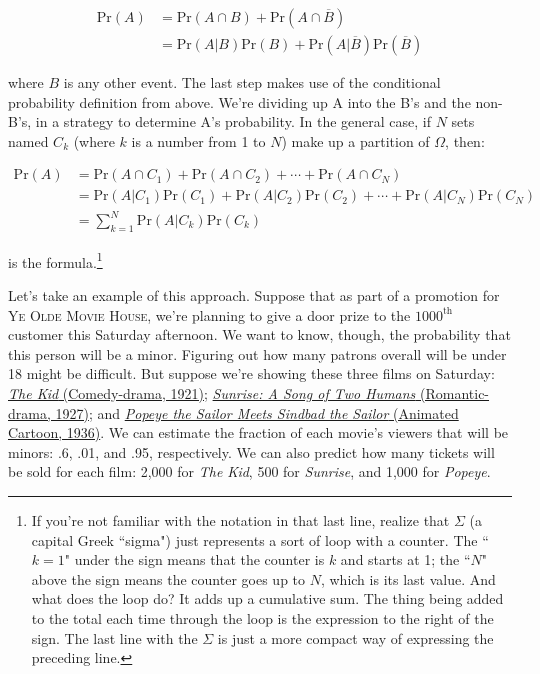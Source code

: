 \begin{align*}
\text{Pr}(A) &= \text{Pr}(A \cap B) + \text{Pr}(A \cap \overline{B}) \\
&= \text{Pr}(A|B) \text{Pr}(B) + \text{Pr}(A|\overline{B}) \text{Pr}(\overline{B})
\end{align*}

where $B$ is any other event. The last step makes use of the conditional
probability definition from above. We're dividing up A into the B's and the
non-B's, in a strategy to determine A's probability. In the general case,
if $N$ sets named $C_k$ (where $k$ is a number from 1 to $N$) make up a
partition of $\Omega$, then:

\begin{align*}
\text{Pr}(A) &= \text{Pr}(A \cap C_1) +
\text{Pr}(A \cap C_2) + 
\cdots +
\text{Pr}(A \cap C_N) \\
&= \text{Pr}(A|C_1) \text{Pr}(C_1) +
\text{Pr}(A|C_2) \text{Pr}(C_2) +
\cdots +
\text{Pr}(A|C_N) \text{Pr}(C_N) \\
&= \sum_{k=1}^N{\text{Pr}(A|C_k) \text{Pr}(C_k)}
\end{align*}

is the formula.\footnote{If you're not familiar with the notation in that
last line, realize that $\Sigma$ (a capital Greek ``sigma") just represents
a sort of loop with a counter. The ``$k=1$" under the sign means that the
counter is $k$ and starts at 1; the ``$N$" above the sign means the counter
goes up to $N$, which is its last value. And what does the loop do? It adds
up a cumulative sum. The thing being added to the total each time through
the loop is the expression to the right of the sign. The last line with the
$\Sigma$ is just a more compact way of expressing the preceding line.}


Let's take an example of this approach. Suppose that as part of a promotion
for \textsc{Ye Olde Movie House}, we're planning to give a door prize to
the $1000^{\text{th}}$ customer this Saturday afternoon. We want to know,
though, the probability that this person will be a minor. Figuring out how
many patrons overall will be under 18 might be difficult. But suppose we're
showing these three films on Saturday: \href{https://en.wikipedia.org/wiki/The_Kid_(1921_film)}{\textit{The Kid} (Comedy-drama, 1921)};
\href{https://en.wikipedia.org/wiki/Sunrise:_A_Song_of_Two_Humans}{\textit{Sunrise: A Song of Two Humans} (Romantic-drama, 1927)};
and \href{https://en.wikipedia.org/wiki/Popeye_the_Sailor_Meets_Sindbad_the_Sailor}{\textit{Popeye the Sailor Meets Sindbad the Sailor}
(Animated Cartoon, 1936)}. We can estimate the fraction of each movie's viewers
that will be minors: .6, .01, and .95, respectively. We can also predict
how many tickets will be sold for each film: 2,000 for \textit{The Kid}, 500
for \textit{Sunrise}, and 1,000 for \textit{Popeye}.


